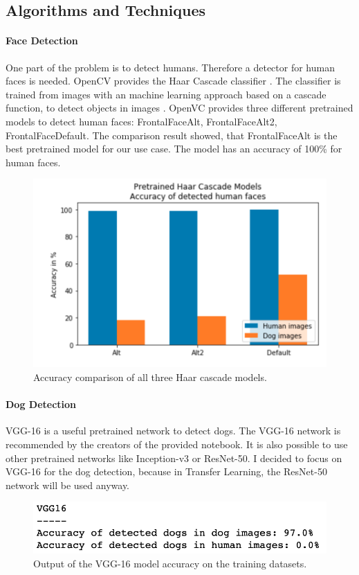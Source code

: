 \documentclass{article}
\begin{document}
\subsection{Algorithms and Techniques}
\paragraph{Face Detection} One part of the problem is to detect humans. Therefore a detector for human faces is needed. OpenCV provides the Haar Cascade classifier \cite{haar_cascade}. The classifier is trained from images with an machine learning approach based on a cascade function, to detect objects in images \cite{opencv}. OpenVC provides three different pretrained models to detect human faces: FrontalFaceAlt, FrontalFaceAlt2, FrontalFaceDefault. The comparison result showed, that FrontalFaceAlt is the best pretrained model for our use case. The model has an accuracy of 100\% for human faces.
\begin{figure}[h]
    \centering
    \includegraphics[scale=0.45]{./images/haar_cascades_results}
    \caption{Accuracy comparison of all three Haar cascade models.}
    \label{fig:haar_cascace_comp}
\end{figure}

\paragraph{Dog Detection} VGG-16 is a useful pretrained network to detect dogs. The VGG-16 network is recommended by the creators of the provided notebook. It is also possible to use other pretrained networks like Inception-v3 or ResNet-50. I decided to focus on VGG-16 for the dog detection, because in Transfer Learning, the ResNet-50 network will be used anyway.
\begin{figure}[h]
    \centering
    \includegraphics[scale=0.45]{./images/vgg16_dog_detector}
    \caption{Output of the VGG-16 model accuracy on the training datasets.}
    \label{fig:dog_detection_acc}
\end{figure}
\end{document}
